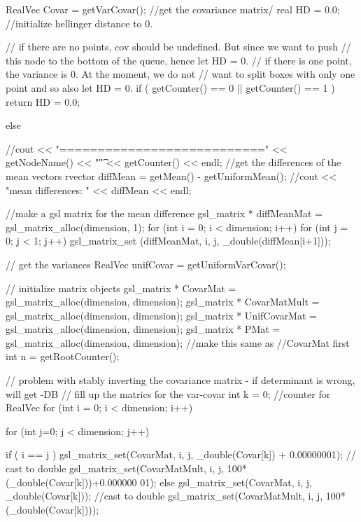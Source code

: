\begin{DoxyCode}
    {
    RealVec Covar = getVarCovar(); //get the covariance matrix/
    real HD = 0.0; //initialize hellinger distance to 0.

    // if there are no points, cov should be undefined. But since we want to
       push
    // this node to the bottom of the queue, hence let HD = 0.
    // if there is one point, the variance is 0. At the moment, we do not 
    // want to split boxes with only one point and so also let HD = 0.
    if ( getCounter() == 0 || getCounter() == 1 ) { return HD = 0.0; } 

    else {
      //cout << "===========================" << getNodeName() << "\t" <<
       getCounter() << endl;
      //get the differences of the mean vectors
      rvector diffMean = getMean() - getUniformMean();
      //cout << "mean differences: " << diffMean << endl;

      //make a gsl matrix for the mean difference
      gsl_matrix * diffMeanMat = gsl_matrix_alloc(dimension, 1);
      for (int i = 0; i < dimension; i++) {
        for (int j = 0; j < 1; j++) {
          gsl_matrix_set (diffMeanMat, i, j, _double(diffMean[i+1]));
        }
      }

      // get the variances
      RealVec unifCovar = getUniformVarCovar();

      // initialize matrix objects
      gsl_matrix * CovarMat = gsl_matrix_alloc(dimension, dimension);
      gsl_matrix * CovarMatMult = gsl_matrix_alloc(dimension, dimension);
      gsl_matrix * UnifCovarMat = gsl_matrix_alloc(dimension, dimension);
      gsl_matrix * PMat = gsl_matrix_alloc(dimension, dimension); //make this
       same as
                                              //CovarMat first
      int n = getRootCounter();
    
      // problem with stably inverting the covariance matrix - if determinant
       is wrong, will get -DB
      // fill up the matrics for the var-covar
      int k = 0; //counter for RealVec
      for (int i = 0; i < dimension; i++) {
        for (int j=0; j < dimension; j++) {

          if ( i == j ) {
            gsl_matrix_set(CovarMat, i, j, _double(Covar[k]) + 0.00000001); //
      cast to double
            gsl_matrix_set(CovarMatMult, i, j, 100*(_double(Covar[k]))+0.000000
      01);
          }
          else {
            gsl_matrix_set(CovarMat, i, j, _double(Covar[k])); //cast to double
            gsl_matrix_set(CovarMatMult, i, j, 100*(_double(Covar[k])));
          }
          
}}}}
\end{DoxyCode}
